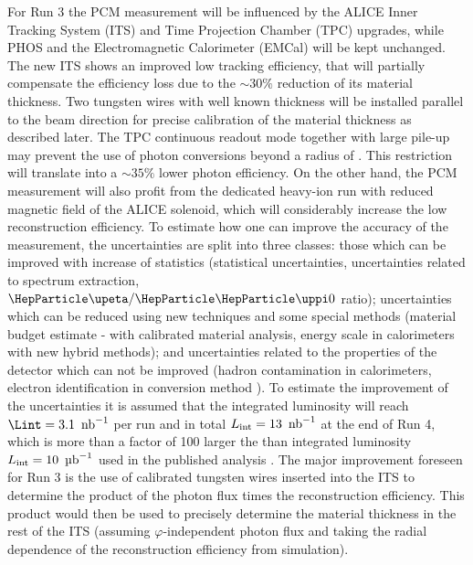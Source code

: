 For Run 3 the PCM measurement will be influenced by the ALICE Inner Tracking System (ITS) and Time Projection Chamber (TPC) upgrades, while PHOS and the Electromagnetic Calorimeter (EMCal) will be kept unchanged. 
The new ITS shows an improved low \pT{} tracking efficiency, that will partially compensate the efficiency loss due to the $\sim30\%$ reduction of its material thickness. Two \unit[1]{\Umm} tungsten wires with well known thickness will be installed parallel to the beam direction for precise calibration of the material thickness as described later. 
The TPC continuous readout mode together with large pile-up may prevent the use of photon conversions beyond a radius of \unit[35]{\Ucm}. This restriction will translate into a $\sim35\%$ lower photon efficiency. On the other hand, the PCM measurement will also profit from the dedicated heavy-ion run with reduced magnetic field of the ALICE solenoid, which will considerably increase the low \pT{} reconstruction efficiency.
To estimate how one can improve the accuracy of the measurement, the uncertainties are split into three classes: those which can be improved with increase of statistics (statistical uncertainties, uncertainties related to \PGpz spectrum extraction, $\PGh/\PGpz$ ratio); uncertainties which can be reduced using new techniques and some special methods (material budget estimate - with calibrated material analysis, energy scale in calorimeters with new hybrid \PGpz methods); and uncertainties related to the properties of the detector which can not be improved (hadron contamination in calorimeters, electron identification in conversion method \etc). 
To estimate the improvement of the uncertainties it is assumed that the integrated luminosity will reach $\Lint=\unit[3.1]{\Unb^{-1}}$ per \PbPb run and in total $L_{\rm int}=\unit[13]{\Unb^{-1}}$ at the end of Run 4, which is more than a factor of 100 larger the than integrated luminosity $L_{\rm int}=\unit[10]{\Uub^{-1}}$ used in the published analysis \cite{Adam:2015lda}. %
The major improvement foreseen for Run 3 is the use of calibrated tungsten wires
inserted into the ITS to determine the product of the photon flux times the \PGg reconstruction efficiency. This product would then be used to precisely determine the material thickness in the rest of the ITS (assuming $\varphi$-independent photon flux and taking the radial dependence of the reconstruction efficiency from simulation).
